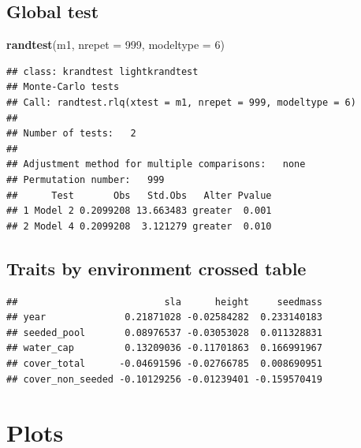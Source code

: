 \documentclass[
]{article}
\newenvironment{Shaded}{\begin{snugshade}}{\end{snugshade}}
\newcommand{\AttributeTok}[1]{\textcolor[rgb]{0.13,0.29,0.53}{#1}}
\newcommand{\DecValTok}[1]{\textcolor[rgb]{0.00,0.00,0.81}{#1}}
\newcommand{\FunctionTok}[1]{\textcolor[rgb]{0.13,0.29,0.53}{\textbf{#1}}}
\newcommand{\NormalTok}[1]{#1}
\newcommand{\SpecialCharTok}[1]{\textcolor[rgb]{0.81,0.36,0.00}{\textbf{#1}}}
\begin{document}
\subsection{Global test}\label{global-test}

\begin{Shaded}
\begin{Highlighting}[]
\FunctionTok{randtest}\NormalTok{(m1, }\AttributeTok{nrepet =} \DecValTok{999}\NormalTok{, }\AttributeTok{modeltype =} \DecValTok{6}\NormalTok{)}
\end{Highlighting}
\end{Shaded}

\begin{verbatim}
## class: krandtest lightkrandtest 
## Monte-Carlo tests
## Call: randtest.rlq(xtest = m1, nrepet = 999, modeltype = 6)
## 
## Number of tests:   2 
## 
## Adjustment method for multiple comparisons:   none 
## Permutation number:   999 
##      Test       Obs   Std.Obs   Alter Pvalue
## 1 Model 2 0.2099208 13.663483 greater  0.001
## 2 Model 4 0.2099208  3.121279 greater  0.010
\end{verbatim}

\subsection{Traits by environment crossed
table}\label{traits-by-environment-crossed-table}

\begin{Shaded}
\end{Shaded}

\begin{verbatim}
##                          sla      height     seedmass
## year              0.21871028 -0.02584282  0.233140183
## seeded_pool       0.08976537 -0.03053028  0.011328831
## water_cap         0.13209036 -0.11701863  0.166991967
## cover_total      -0.04691596 -0.02766785  0.008690951
## cover_non_seeded -0.10129256 -0.01239401 -0.159570419
\end{verbatim}

\section{Plots}\label{plots}

\begin{Shaded}
\end{Shaded}
\end{document}
